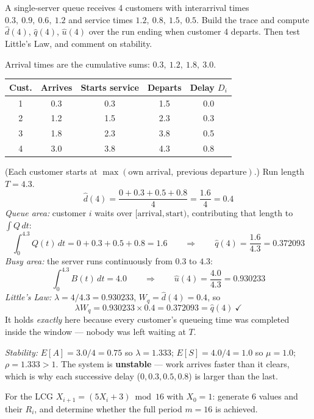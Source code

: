 \begin{probbox}
 A single-server queue receives 4 customers with interarrival times $0.3,\ 0.9,\ 0.6,\ 1.2$ and service times $1.2,\ 0.8,\ 1.5,\ 0.5$. Build the trace and compute $\hat d(4)$, $\hat q(4)$, $\hat u(4)$ over the run ending when customer 4 departs. Then test Little's Law, and comment on stability.

\ans Arrival times are the cumulative sums: $0.3,\ 1.2,\ 1.8,\ 3.0$.
\begin{center}\small
\begin{tabular}{@{}ccccc@{}}
\toprule
Cust. & Arrives & Starts service & Departs & Delay $D_i$\\
\midrule
1 & 0.3 & 0.3 & 1.5 & 0.0\\
2 & 1.2 & 1.5 & 2.3 & 0.3\\
3 & 1.8 & 2.3 & 3.8 & 0.5\\
4 & 3.0 & 3.8 & 4.3 & 0.8\\
\bottomrule
\end{tabular}
\end{center}
(Each customer starts at $\max(\text{own arrival},\ \text{previous departure})$.) Run length $T = 4.3$.
\[
\hat d(4) = \frac{0+0.3+0.5+0.8}{4} = \frac{1.6}{4} = \mathbf{0.4}
\]
\emph{Queue area:} customer $i$ waits over $[\text{arrival},\text{start})$, contributing that length to $\int Q\,dt$:
\[
\int_0^{4.3}Q(t)\,dt = 0 + 0.3+0.5+0.8 = 1.6
\qquad\Rightarrow\qquad
\hat q(4) = \frac{1.6}{4.3} = \mathbf{0.372093}
\]
\emph{Busy area:} the server runs continuously from $0.3$ to $4.3$:
\[
\int_0^{4.3}B(t)\,dt = 4.0 \qquad\Rightarrow\qquad \hat u(4) = \frac{4.0}{4.3} = \mathbf{0.930233}
\]
\emph{Little's Law:} $\lambda = 4/4.3 = 0.930233$, $W_q = \hat d(4) = 0.4$, so
\[
\lambda W_q = 0.930233\times0.4 = 0.372093 = \hat q(4) \ \checkmark
\]
It holds \emph{exactly} here because every customer's queueing time was completed inside the window --- nobody was left waiting at $T$.

\emph{Stability:} $E[A] = 3.0/4 = 0.75$ so $\lambda = 1.333$; $E[S] = 4.0/4 = 1.0$ so $\mu = 1.0$; $\rho = 1.333 > 1$. The system is \textbf{unstable} --- work arrives faster than it clears, which is why each successive delay ($0, 0.3, 0.5, 0.8$) is larger than the last.

 For the LCG $X_{i+1} = (5X_i+3)\bmod16$ with $X_0 = 1$: generate 6 values and their $R_i$, and determine whether the full period $m=16$ is achieved.


\end{probbox}
